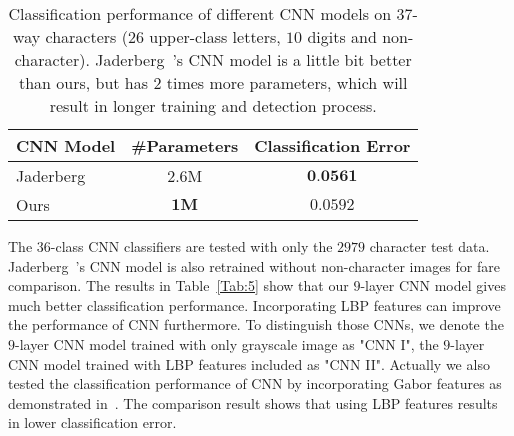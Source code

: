 \documentclass[twocolumn]{svjour3}
\begin{document}
\begin{table}[ht]
	\begin{center}
	\caption{Classification performance of different CNN models on $37$-way characters ($26$ upper-class letters, $10$ digits and non-character). Jaderberg~\etal's CNN model is a little bit better than ours, but has $2$ times more parameters, which will result in longer training and detection process.}
	\label{Tab:4}{
	\begin{tabular}{l|c|c}
	\hline
	 CNN Model & \#Parameters & Classification Error  \\
	\hline
	 Jaderberg~\etal~\cite{Max2014ECCV} & $2.6$M & $\textbf{0.0561}$ \\
	\hline
     Ours & $\textbf{1M}$ & $0.0592$ \\
	\hline
	\end{tabular}
	}
	\end{center}
\end{table}The $36$-class CNN classifiers are tested with only the $2979$ character test data. Jaderberg~\etal's CNN model is also retrained without non-character images for fare comparison. The results in Table~\ref{Tab:5} show that our $9$-layer CNN model gives much better classification performance. Incorporating LBP features can improve the performance of CNN furthermore.
To distinguish those CNNs, we denote the $9$-layer CNN model trained with only grayscale image as "CNN I", the $9$-layer CNN model trained with LBP features included as "CNN II".
Actually we also tested the classification performance of CNN by incorporating Gabor features as demonstrated in~\cite{Zhong2015High}. The comparison result shows that using LBP features results in lower classification error.
\end{document}
